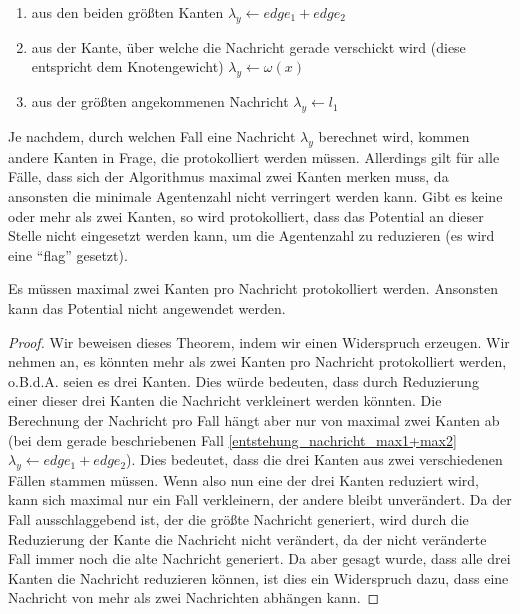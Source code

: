 \begin{enumerate}[label=\alph*)]
	
	\item aus den beiden größten Kanten $\lambda_{y} \gets edge_{1} + edge_{2}$ \label{entstehung_nachricht_max1+max2}
	
	\item aus der Kante, über welche die Nachricht gerade verschickt wird (diese entspricht dem Knotengewicht) $\lambda_{y} \gets \omega(x)$
	
	\item aus der größten angekommenen Nachricht $\lambda_{y} \gets l_{1}$

\end{enumerate}

Je nachdem, durch welchen Fall eine Nachricht $\lambda_{y}$ berechnet wird, kommen andere Kanten in Frage, die protokolliert werden müssen.
Allerdings gilt für alle Fälle, dass sich der Algorithmus maximal zwei Kanten merken muss, da ansonsten die minimale Agentenzahl nicht verringert werden kann. Gibt es keine oder mehr als zwei Kanten, so wird protokolliert, dass das Potential an dieser Stelle nicht eingesetzt werden kann, um die Agentenzahl zu reduzieren (es wird eine "`flag"' gesetzt).

\begin{theorem}\label{theorem_max2kanten}
	Es müssen maximal zwei Kanten pro Nachricht protokolliert werden. Ansonsten kann das Potential nicht angewendet werden.
\end{theorem}

\begin{proof}
	Wir beweisen dieses Theorem, indem wir einen Widerspruch erzeugen. Wir nehmen an, es könnten mehr als zwei Kanten pro Nachricht protokolliert werden, o.B.d.A. seien es drei Kanten. Dies würde bedeuten, dass durch Reduzierung einer dieser drei Kanten die Nachricht verkleinert werden könnten. Die Berechnung der Nachricht pro Fall hängt aber nur von maximal zwei Kanten ab (bei dem gerade beschriebenen Fall \ref{entstehung_nachricht_max1+max2} $\lambda_{y} \gets edge_{1} + edge_{2}$). Dies bedeutet, dass die drei Kanten aus zwei verschiedenen Fällen stammen müssen. Wenn also nun eine der drei Kanten reduziert wird, kann sich maximal nur ein Fall verkleinern, der andere bleibt unverändert. Da der Fall ausschlaggebend ist, der die größte Nachricht generiert, wird durch die Reduzierung der Kante die Nachricht nicht verändert, da der nicht veränderte Fall immer noch die alte Nachricht generiert. Da aber gesagt wurde, dass alle drei Kanten die Nachricht reduzieren können, ist dies ein Widerspruch dazu, dass eine Nachricht von mehr als zwei Nachrichten abhängen kann.
\end{proof}

